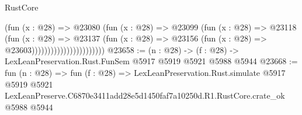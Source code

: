 \begin{lexlean}{RustCore}
\begin{coremodule}
                                      (fun (x : @28) =>
                                      @23080
                                        (fun (x : @28) =>
                                        @23099
                                          (fun (x : @28) =>
                                          @23118
                                            (fun (x : @28) =>
                                            @23137
                                              (fun (x : @28) =>
                                              @23156 (fun (x : @28) => @23603)))))))))))))))))))))))
@23658 := (n : @28) -> (f : @28) -> LexLeanPreservation.Rust.FunSem @5917 @5919 @5921 @5988 @5944
@23668 := fun (n : @28) =>
  fun (f : @28) =>
  LexLeanPreservation.Rust.simulate
    @5917
    @5919
    @5921
    LexLeanPreserve.C6870e3411add28e5d1450faf7a10250d.R1.RustCore.crate_ok
    @5988
    @5944
\end{coremodule}
\end{lexlean}
